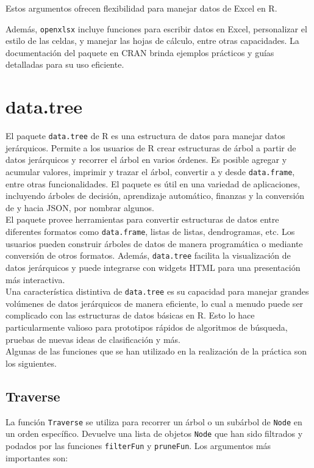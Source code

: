 \documentclass[12pt]{report}\usepackage[]{graphicx}\usepackage[dvipsnames]{xcolor}
\begin{document}
 	Estos argumentos ofrecen flexibilidad para manejar datos de Excel en R.
 	
 	Además, \texttt{openxlsx} incluye funciones para escribir datos en Excel, personalizar el estilo de las celdas, y manejar las hojas de cálculo, entre otras capacidades. La documentación del paquete en CRAN brinda ejemplos prácticos y guías detalladas para su uso eficiente.
 	
 	\section{data.tree}
 	
 	El paquete \texttt{data.tree} de R es una estructura de datos para manejar datos jerárquicos. Permite a los usuarios de R crear estructuras de árbol a partir de datos jerárquicos y recorrer el árbol en varios órdenes. Es posible agregar y acumular valores, imprimir y trazar el árbol, convertir a y desde \texttt{data.frame}, entre otras funcionalidades. El paquete es útil en una variedad de aplicaciones, incluyendo árboles de decisión, aprendizaje automático, finanzas y la conversión de y hacia JSON, por nombrar algunos.\\
 	
 	El paquete provee herramientas para convertir estructuras de datos entre diferentes formatos como \texttt{data.frame}, listas de listas, dendrogramas, etc. Los usuarios pueden construir árboles de datos de manera programática o mediante conversión de otros formatos. Además, \texttt{data.tree} facilita la visualización de datos jerárquicos y puede integrarse con widgets HTML para una presentación más interactiva.\\
 	
 	Una característica distintiva de \texttt{data.tree} es su capacidad para manejar grandes volúmenes de datos jerárquicos de manera eficiente, lo cual a menudo puede ser complicado con las estructuras de datos básicas en R. Esto lo hace particularmente valioso para prototipos rápidos de algoritmos de búsqueda, pruebas de nuevas ideas de clasificación y más.\\
 	
 	Algunas de las funciones que se han utilizado en la realización de la práctica son los siguientes.
 	
 	\subsection{Traverse}
 	
 	La función \texttt{Traverse} se utiliza para recorrer un árbol o un subárbol de \texttt{Node} en un orden específico. Devuelve una lista de objetos \texttt{Node} que han sido filtrados y podados por las funciones \texttt{filterFun} y \texttt{pruneFun}. Los argumentos más importantes son:
 	
\end{document}
